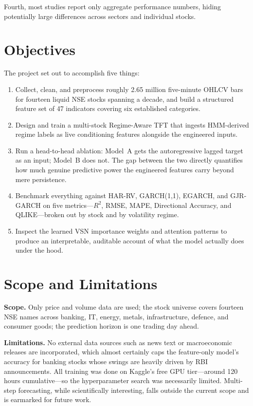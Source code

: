 Fourth, most studies report only aggregate performance numbers, hiding potentially large differences across sectors and individual stocks.

\section{Objectives}

The project set out to accomplish five things:

\begin{enumerate}
\item Collect, clean, and preprocess roughly 2.65 million five-minute OHLCV bars for fourteen liquid NSE stocks spanning a decade, and build a structured feature set of 47 indicators covering six established categories.
\item Design and train a multi-stock Regime-Aware TFT that ingests HMM-derived regime labels as live conditioning features alongside the engineered inputs.
\item Run a head-to-head ablation: Model~A gets the autoregressive lagged target as an input; Model~B does not. The gap between the two directly quantifies how much genuine predictive power the engineered features carry beyond mere persistence.
\item Benchmark everything against HAR-RV, GARCH(1,1), EGARCH, and GJR-GARCH on five metrics---$R^2$, RMSE, MAPE, Directional Accuracy, and QLIKE---broken out by stock and by volatility regime.
\item Inspect the learned VSN importance weights and attention patterns to produce an interpretable, auditable account of what the model actually does under the hood.
\end{enumerate}

\section{Scope and Limitations}

\textbf{Scope.} Only price and volume data are used; the stock universe covers fourteen NSE names across banking, IT, energy, metals, infrastructure, defence, and consumer goods; the prediction horizon is one trading day ahead.

\textbf{Limitations.} No external data sources such as news text or macroeconomic releases are incorporated, which almost certainly caps the feature-only model's accuracy for banking stocks whose swings are heavily driven by RBI announcements. All training was done on Kaggle's free GPU tier---around 120 hours cumulative---so the hyperparameter search was necessarily limited. Multi-step forecasting, while scientifically interesting, falls outside the current scope and is earmarked for future work.

